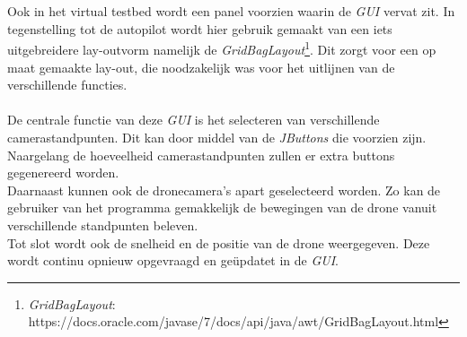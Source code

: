 \\
\\
Ook in het virtual testbed wordt een panel voorzien waarin de \textit{GUI} vervat zit. In tegenstelling tot de autopilot wordt hier gebruik gemaakt van een iets uitgebreidere lay-outvorm namelijk de \textit{GridBagLayout}\footnote{\textit{GridBagLayout}: https://docs.oracle.com/javase/7/docs/api/java/awt/GridBagLayout.html}. Dit zorgt voor een op maat gemaakte lay-out, die noodzakelijk was voor het uitlijnen van de verschillende functies. 
\\
\\
De centrale functie van deze \textit{GUI} is het selecteren van verschillende camerastandpunten. Dit kan door middel van de \textit{JButtons} die voorzien zijn. Naargelang de hoeveelheid camerastandpunten zullen er extra buttons gegenereerd worden.
\\
Daarnaast kunnen ook de dronecamera's apart geselecteerd worden. Zo kan de gebruiker van het programma gemakkelijk de bewegingen van de drone vanuit verschillende standpunten beleven.  
\\
Tot slot wordt ook de snelheid en de positie van de drone weergegeven. Deze wordt continu opnieuw opgevraagd en ge\"{u}pdatet in de \textit{GUI}. 